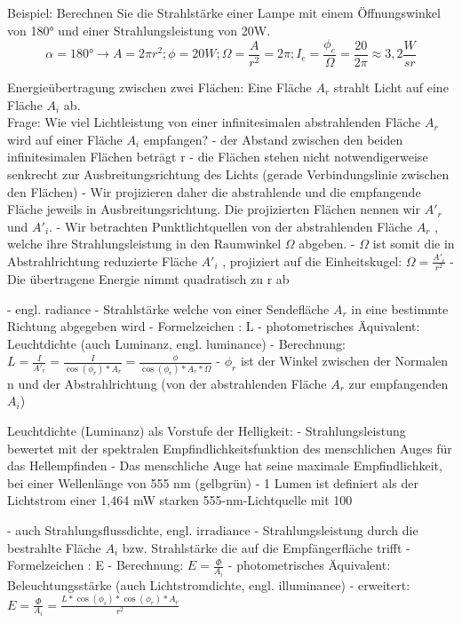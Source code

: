 \documentclass[10pt,landscape]{article}
\begin{document}
\begin{multicols}{3}
Beispiel: Berechnen Sie die Strahlstärke einer Lampe mit einem Öffnungswinkel von 180° und einer Strahlungsleistung von 20W.
$$\alpha=180°\rightarrow A=2\pi r^2; \phi =20W; \Omega=\frac{A}{r^2}=2\pi ; I_e=\frac{\phi_e}{\Omega}=\frac{20}{2\pi}\approx 3,2 \frac{W}{sr}$$

Energieübertragung zwischen zwei Flächen:
Eine Fläche $A_r$ strahlt Licht auf eine Fläche $A_i$ ab.\\
Frage: Wie viel Lichtleistung von einer infinitesimalen abstrahlenden Fläche $A_r$ wird auf einer Fläche $A_i$ empfangen?
- der Abstand zwischen den beiden infinitesimalen Flächen beträgt r
- die Flächen stehen nicht notwendigerweise senkrecht zur Ausbreitungsrichtung des Lichts (gerade Verbindungslinie zwischen den Flächen)
- Wir projizieren daher die abstrahlende und die empfangende Fläche jeweils in Ausbreitungsrichtung. Die projizierten Flächen nennen wir $A'_r$ und $A'_i$.
- Wir betrachten Punktlichtquellen von der abstrahlenden Fläche $A_r$ , welche ihre Strahlungsleistung in den Raumwinkel $\Omega$ abgeben.
- $\Omega$ ist somit die in Abstrahlrichtung reduzierte Fläche $A'_i$ , projiziert auf die Einheitskugel: $\Omega=\frac{A'_i}{r^2}$
  - Die übertragene Energie nimmt quadratisch zu r ab

- engl. radiance
- Strahlstärke welche von einer Sendefläche $A_r$ in eine bestimmte Richtung abgegeben wird
- Formelzeichen : L
- photometrisches Äquivalent: Leuchtdichte (auch Luminanz, engl. luminance)
- Berechnung: $L = \frac{I}{A'_r}=\frac{I}{\cos(\phi_r)*A_r} = \frac{\phi}{\cos(\phi_r)*A_r*\Omega}$
- $\phi_r$ ist der Winkel zwischen der Normalen n und der Abstrahlrichtung (von der abstrahlenden Fläche $A_r$ zur empfangenden $A_i$)

Leuchtdichte (Luminanz) als Vorstufe der Helligkeit:
- Strahlungsleistung bewertet mit der spektralen Empfindlichkeitsfunktion des menschlichen Auges für das Hellempfinden
- Das menschliche Auge hat seine maximale Empfindlichkeit, bei einer Wellenlänge von 555 nm (gelbgrün)
- 1 Lumen ist definiert als der Lichtstrom einer 1,464 mW starken 555-nm-Lichtquelle mit 100%


- auch Strahlungsflussdichte, engl. irradiance
- Strahlungsleistung durch die bestrahlte Fläche $A_i$ bzw. Strahlstärke die auf die Empfängerfläche trifft
- Formelzeichen : E
- Berechnung: $E =\frac{\Phi}{A_i}$
- photometrisches Äquivalent: Beleuchtungsstärke (auch Lichtstromdichte, engl. illuminance)
- erweitert: $E=\frac{\Phi}{A_i}=\frac{L*\cos(\phi_i)*\cos(\phi_r)*A_r}{r^2}$


\end{multicols}
\end{document}
